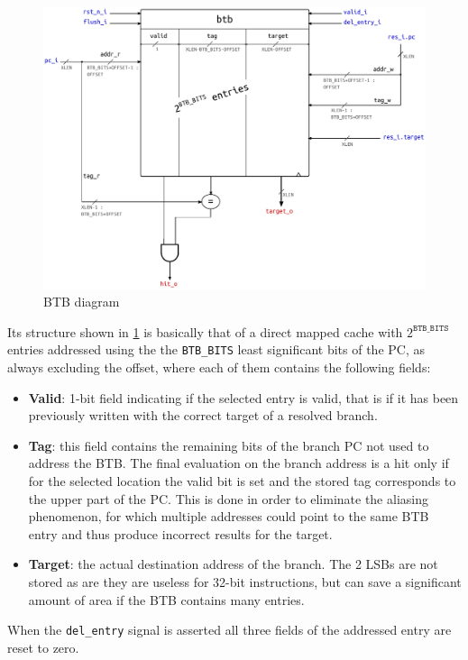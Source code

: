 \begin{figure}[hbt]
  \vspace{2cm}
  \centering
  \includegraphics[width=\textwidth]{img/btb.pdf}
  \caption{\acs{BTB} diagram}
  \label{fig:btb}
\end{figure}
Its structure shown in \cref{fig:btb} is basically that of a direct mapped cache with $2^{\texttt{BTB\_BITS}}$ entries addressed using the the \texttt{BTB\_BITS} least significant bits of the \ac{PC}, as always excluding the offset, where each of them contains the following fields:
\begin{itemize}
  \item \textbf{Valid}: 1-bit field indicating if the selected entry is valid, that is if it has been previously written with the correct target of a resolved branch.
  \item \textbf{Tag}: this field contains the remaining bits of the branch \ac{PC} not used to address the \ac{BTB}. The final evaluation on the branch address is a hit only if for the selected location the valid bit is set and the stored tag corresponds to the upper part of the \ac{PC}. This is done in order to eliminate the aliasing phenomenon, for which multiple addresses could point to the same \ac{BTB} entry and thus produce incorrect results for the target. 
  \item \textbf{Target}: the actual destination address of the branch. The 2 LSBs are not stored as are they are useless for 32-bit instructions, but can save a significant amount of area if the \ac{BTB} contains many entries.
\end{itemize}
When the \texttt{del\_entry} signal is asserted all three fields of the addressed entry are reset to zero.

